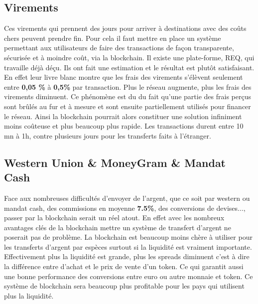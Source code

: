 \documentclass[12pt]{report}
\begin{document}

    \subsection{Virements}
    
\hspace{1cm} Ces virements qui prennent des jours pour arriver à destinations avec des coûts chers peuvent prendre fin. Pour cela il faut mettre en place un système permettant aux utilisateurs  de faire des transactions de façon transparente, sécurisée et à moindre coût, via la blockchain. Il existe une plate-forme, REQ, qui travaille déjà déçu. Ils ont fait une estimation et le résultat est plutôt satisfaisant. En effet leur livre blanc montre que les frais des virements s'élèvent seulement  entre \textbf{0,05 \%} à \textbf{0,5\%} par transaction. Plus le réseau augmente, plus les frais des virements diminuent. Ce phénomène est du du fait qu'une partie des frais perçus sont brûlés au fur et à mesure et sont ensuite partiellement utilisés pour financer le réseau. Ainsi la blockchain pourrait alors constituer une solution infiniment moins coûteuse et plus beaucoup plus rapide. Les transactions durent entre 10 mn à 1h, contre plusieurs jours pour les transferts faits à l’étranger.\\


    \subsection{Western Union \& MoneyGram \& Mandat Cash}
    
\hspace{1cm} Face aux nombreuses difficultés d'envoyer de l'argent, que ce soit par western ou mandat cash,  des commissions en moyenne \textbf{7.5\%}, des conversions de devises..., passer par la blockchain serait un réel atout. En effet avec les nombreux avantages clés de la blockchain mettre un système de transfert d'argent ne poserait pas de problème. La blockchain est beaucoup moins chère à utiliser pour les transferts d'argent par espèces surtout si la liquidité est vraiment importante. Effectivement plus la liquidité est grande, plus les spreads diminuent c'est à dire la différence entre d'achat et le prix de vente d'un token. Ce qui garantit aussi une bonne performance des conversions entre euro ou autre monnaie et token.  Ce système de blockchain sera beaucoup plus profitable pour les pays qui utilisent plus la liquidité.\\
\end{document}
